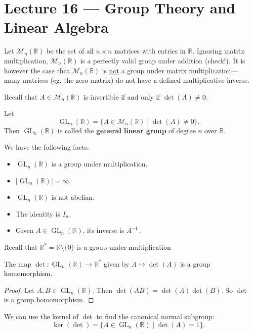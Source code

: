 \section{Lecture 16 — Group Theory and Linear Algebra}

Let $\mathcal M_n(\mathbb R)$ be the set of all $n\times n$ matrices with entries in $\mathbb R$. Ignoring matrix multiplication, $\mathcal M_n(\mathbb R)$ is a perfectly valid group under addition (check!). It is however the case that $\mathcal M_n(\mathbb R)$ is \underline{not} a group under matrix multiplication—many matrices (eg. the zero matrix) do not have a defined multiplicative inverse.

Recall that $A\in\mathcal M_n(\mathbb R)$ is invertible if and only if $\det(A)\neq 0$.

\begin{definition}
	Let
	$$\operatorname{GL}_n(\mathbb R)=\{A\in\mathcal M_n(\mathbb R)\mid \det(A)\neq 0\}.$$
	Then $\operatorname{GL}_n(\mathbb R)$ is called the \textbf{general linear group} of degree $n$ over $\mathbb R$.
\end{definition}

We have the following facts:
\begin{itemize}
	\item $\operatorname{GL}_n(\mathbb R)$ is a group under multiplication.
	\item $|{\operatorname{GL}_n(\mathbb R)}|=\infty$.
	\item $\operatorname{GL}_n(\mathbb R)$ is not abelian.
	\item The identity is $I_n$.
	\item Given $A\in \operatorname{GL}_n(\mathbb R)$, its inverse is $A^{-1}$.
\end{itemize}

Recall that $\mathbb R^*=\mathbb R\setminus\{0\}$ is a group under multiplication

\begin{theorem}
	The map $\det\colon\operatorname{GL}_n(\mathbb R)\to\mathbb R^*$ given by $A\mapsto\det(A)$ is a group homomorphism.
\end{theorem}

\begin{proof}
	Let $A,B\in\operatorname{GL}_n(\mathbb R)$. Then $\det(AB)=\det(A)\det(B)$. So $\det$ is a group homomorphism.
\end{proof}

We can use the kernel of $\det$ to find the canonical normal subgroup:
$$\ker(\det)=\{A\in\operatorname{GL}_n(\mathbb R)\mid\det(A)=1\}.$$

